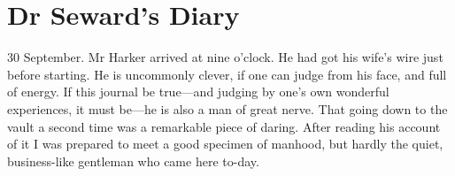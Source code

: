 \section{Dr Seward's Diary}

\begin{diary}{30 September.}
Mr Harker arrived at nine o'clock. He had got his wife's wire just before starting. He is uncommonly clever, if one can judge from his face, and full of energy. If this journal be true—and judging by one's own wonderful experiences, it must be—he is also a man of great nerve. That going down to the vault a second time was a remarkable piece of daring. After reading his account of it I was prepared to meet a good specimen of manhood, but hardly the quiet, business-like gentleman who came here to-day.
\end{diary}
 

